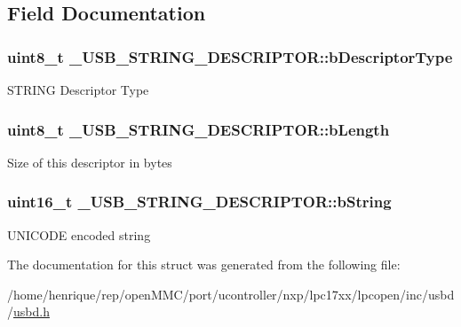 \subsection{Field Documentation}
\hypertarget{struct__USB__STRING__DESCRIPTOR_a03f4e8b870398d2410b49adce1466054}{
\subsubsection[{b\-Descriptor\-Type}]{\setlength{\rightskip}{0pt plus 5cm}uint8\-\_\-t \-\_\-\-U\-S\-B\-\_\-\-S\-T\-R\-I\-N\-G\-\_\-\-D\-E\-S\-C\-R\-I\-P\-T\-O\-R\-::b\-Descriptor\-Type}}\label{struct__USB__STRING__DESCRIPTOR_a03f4e8b870398d2410b49adce1466054}
S\-T\-R\-I\-N\-G Descriptor Type \hypertarget{struct__USB__STRING__DESCRIPTOR_a27d5cd3019611e53d3588192d4c72b05}{
\subsubsection[{b\-Length}]{\setlength{\rightskip}{0pt plus 5cm}uint8\-\_\-t \-\_\-\-U\-S\-B\-\_\-\-S\-T\-R\-I\-N\-G\-\_\-\-D\-E\-S\-C\-R\-I\-P\-T\-O\-R\-::b\-Length}}\label{struct__USB__STRING__DESCRIPTOR_a27d5cd3019611e53d3588192d4c72b05}
Size of this descriptor in bytes \hypertarget{struct__USB__STRING__DESCRIPTOR_abbe1c4825365ecb9af165153435a6ef4}{
\subsubsection[{b\-String}]{\setlength{\rightskip}{0pt plus 5cm}uint16\-\_\-t \-\_\-\-U\-S\-B\-\_\-\-S\-T\-R\-I\-N\-G\-\_\-\-D\-E\-S\-C\-R\-I\-P\-T\-O\-R\-::b\-String}}\label{struct__USB__STRING__DESCRIPTOR_abbe1c4825365ecb9af165153435a6ef4}
U\-N\-I\-C\-O\-D\-E encoded string 

The documentation for this struct was generated from the following file\-:\begin{DoxyCompactItemize}
\item 
/home/henrique/rep/open\-M\-M\-C/port/ucontroller/nxp/lpc17xx/lpcopen/inc/usbd/\hyperlink{usbd_8h}{usbd.\-h}\end{DoxyCompactItemize}
